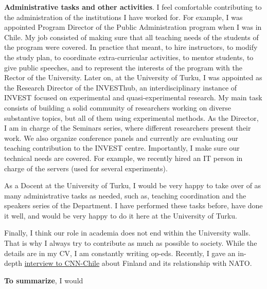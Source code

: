 \documentclass[10pt,stdletter,dateno,sigleft]{newlfm} %
\begin{document}
\begin{newlfm}
{\bf Administrative tasks and other activities}. I feel comfortable contributing to the administration of the institutions I have worked for. For example, I was appointed Program Director of the Public Administration program when I was in Chile. My job consisted of making sure that all teaching needs of the students of the program were covered. In practice that meant, to hire instructors, to modify the study plan, to coordinate extra-curricular activities, to mentor students, to give public speeches, and to represent the interests of the program with the Rector of the University. Later on, at the University of Turku, I was appointed as the Research Director of the INVESThub, an interdisciplinary instance of INVEST focused on experimental and quasi-experimental research. My main task consists of building a solid community of researchers working on diverse substantive topics, but all of them using experimental methods. As the Director, I am in charge of the Seminars series, where different researchers present their work. We also organize conference panels and currently are evaluating our teaching contribution to the INVEST centre. Importantly, I make sure our technical needs are covered. For example, we recently hired an IT person in charge of the servers (used for several experiments).

As a Docent at the University of Turku, I would be very happy to take over of as many administrative tasks as needed, such as, teaching coordination and the speakers series of the Department. I have performed these tasks before, have done it well, and would be very happy to do it here at the University of Turku.

Finally, I think our role in academia does not end within the University walls. That is why I always try to contribute as much as possible to society. While the details are in my CV, I am constantly writing op-eds. Recently, I gave an in-depth \href{https://twitter.com/CNNChile/status/1527122195780186112?s=20&t=-tO34V0-IHexWmRUePwHJ/}{interview to CNN-Chile} about Finland and its relationship with NATO. 

{\bf To summarize}, I would


{\unskip}

\newpage
\printbibliography



\end{newlfm}
\end{document}

